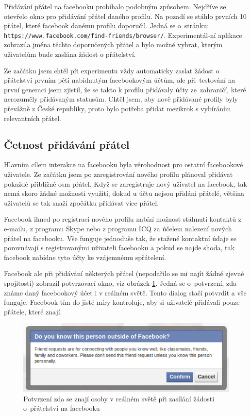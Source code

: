 \documentclass[thesis=M,czech]{FITthesis}[2013/05/10]
\begin{document}
Přidávání přátel na facebooku probíhalo podobným způsobem. Nejdříve se otevřelo okno pro přidávání přátel daného profilu. Na pozadí se stáhlo prvních 10 přátel, které facebook danému profilu doporučil. Jedná se o~stránku: \verb|https://www.facebook.com/find-friends/browser/|. Experimentál-ní aplikace zobrazila jména těchto doporučených přátel a bylo možné vybrat, kterým uživatelům bude zaslána žádost o přátelství. 

Ze začátku jsem chtěl při experimentu vždy automaticky zaslat žádost o přátelství prvním pěti nabídnutým facebookovým účtům, ale při~testování na první generaci jsem zjistil, že se takto k profilu přidávaly účty ze~zahraničí, které nerozuměly přidávaným statusům. Chtěl jsem, aby nově přidávané profily byly převážně z České republiky, proto bylo potřeba přidat mezikrok s vybíráním relevantních přátel.

\subsection{Četnost přidávání přátel}

Hlavním cílem interakce na facebooku byla věrohodnost pro ostatní facebookové uživatele. Ze začátku jsem po zaregistrování nového profilu plánoval přidávat pokaždé přibližně osm přátel. Když se zaregistruje nový uživatel na facebook, tak nemá skoro žádné možnosti využití, dokud u účtu nejsou přidáni přátelé, většina uživatelů se tak snaží zpočátku přidávat více přátel. 

Facebook ihned po registraci nového profilu nabízí možnost stáhnutí kontaktů z e-mailu, z programu Skype nebo z programu ICQ za účelem nalezení nových přátel na facebooku. Vše funguje jednoduše tak, že stažené kontaktní údaje se porovnávají s registrovanými uživateli facebooku a pokud se najde shoda, tak facebook nabídne tyto účty ke vzájemnému spřátelení.

Facebook ale při přidávání některých přátel (nepodařilo se mi najít žádné zjevné spojitosti) zobrazil potvrzovací okno, viz obrázek \ref{fig:confirmFriendship}. Jedná se o~potvrzení, zda známe daný facebookový účet i v reálném světě. Tento dialog stačí potvrdit a vše funguje. Facebook tím do jisté míry kontroluje, aby si uživatelé přidávali pouze přátele, které znají.

\begin{figure}[h]
\begin{center}
\includegraphics[width=5in]{figures/confirm-friendship.png}
\caption{Potvrzení zda se znají osoby v reálném světě při zasílání žádosti o~přátelství na facebooku}
\label{fig:confirmFriendship}
\end{center}
\end{figure}
\end{document}

